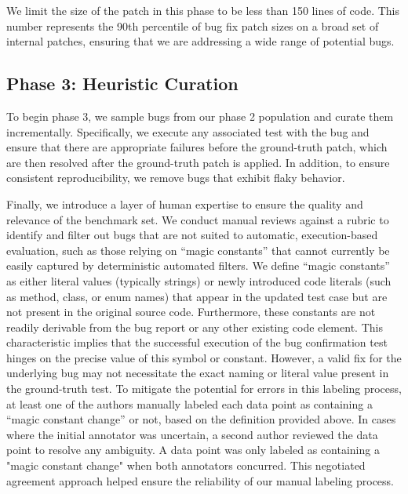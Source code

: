 We limit the size of the patch in this phase to be less than 150 lines of code. This number represents the 90th percentile of bug fix patch sizes on a broad set of internal patches, ensuring that we are addressing a wide range of potential bugs.





\subsection{Phase 3: Heuristic Curation}

To begin phase 3, we sample bugs from our phase 2 population and curate them incrementally.
Specifically, we execute any associated test with the
bug and ensure that there are appropriate failures 
before the ground-truth patch, which are then resolved
after the ground-truth patch is applied. In addition, to 
ensure consistent reproducibility, we remove
bugs that exhibit flaky behavior.

Finally, we introduce a layer of human expertise to ensure the quality and relevance of the benchmark set. We conduct manual reviews against a rubric to identify and filter out bugs that are not suited to automatic, execution-based evaluation, such as those relying on ``magic constants'' that cannot currently be easily captured by deterministic automated filters.
We define ``magic constants'' as either literal values (typically strings) or newly introduced code literals (such as method, class, or enum names) that appear in the updated test case but are not present in the original source code. Furthermore, these constants are not readily derivable from the bug report or any other existing code element. This characteristic implies that the successful execution of the bug confirmation test hinges on the precise value of this symbol or constant. However, a valid fix for the underlying bug may not necessitate the exact naming or literal value present in the ground-truth test.
To mitigate the potential for errors in this labeling process, at least one of the authors manually labeled each data point as containing a ``magic constant change'' or not, based on the definition provided above. In cases where the initial annotator was uncertain, a second author reviewed the data point to resolve any ambiguity.  A data point was only labeled as containing a "magic constant change" when both annotators concurred. This negotiated agreement approach helped ensure the reliability of our manual labeling process. 

